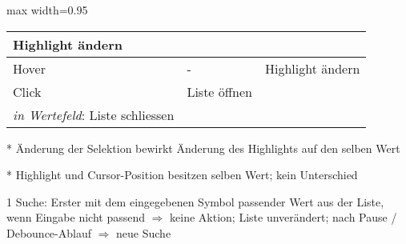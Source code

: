 \begin{table}[!htb]
\begin{adjustbox}{max width=0.95\textwidth}
\begin{threeparttable}
\begin{tabular}{ l || l | l }
{                                                                         Highlight ändern}        \\
                \hline
                Hover      & -                     & Highlight ändern                             \\
                \hline
                Click      & Liste öffnen          & \tbbr{\emph{in Liste}: Selektion ändern \\
                                                           \emph{in Wertefeld}: Liste schliessen} \\
                \hline
            \end{tabular}
            \begin{tablenotes}
                \scriptsize
                \item[*] Änderung der Selektion bewirkt Änderung des Highlights auf den selben Wert
                \item[*] Highlight und Cursor-Position besitzen selben Wert; kein Unterschied
                \item
                \item[1] Suche: Erster mit dem eingegebenen Symbol passender Wert aus der Liste, wenn Eingabe nicht passend $\Rightarrow$ keine Aktion; 
                                Liste unverändert; nach Pause / Debounce-Ablauf $\Rightarrow$ neue Suche
            \end{tablenotes}
        \end{threeparttable}
    \end{adjustbox}
\end{table}
